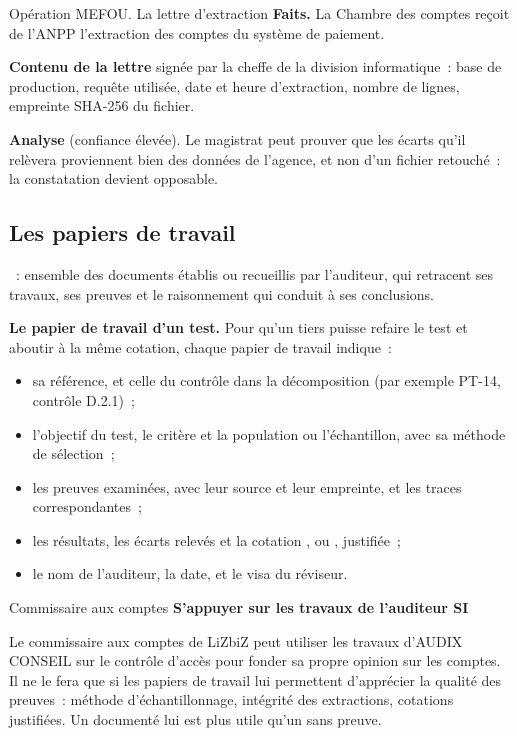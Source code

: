 \begin{boxscenario}{Opération MEFOU. La lettre d'extraction}
\textbf{Faits.} La Chambre des comptes reçoit de l'ANPP l'extraction des
comptes du système de paiement.

\medskip
\textbf{Contenu de la lettre} signée par la cheffe de la division
informatique~: base de production, requête utilisée, date et heure
d'extraction, nombre de lignes, empreinte SHA-256 du fichier.

\medskip
\textbf{Analyse} (confiance élevée). Le magistrat peut prouver que les écarts
qu'il relèvera proviennent bien des données de l'agence, et non d'un fichier
retouché~: la constatation devient opposable.
\end{boxscenario}

\subsection{Les papiers de travail}

\begin{boxdef}
~: ensemble des
documents établis ou recueillis par l'auditeur, qui retracent ses
travaux, ses preuves et le raisonnement qui conduit à ses conclusions.
\end{boxdef}

\begin{boxprocedure}
\textbf{Le papier de travail d'un test.} Pour qu'un tiers puisse refaire le
test et aboutir à la même cotation, chaque papier de travail indique~:
\begin{itemize}
    \item sa référence, et celle du contrôle dans la décomposition (par
          exemple PT-14, contrôle D.2.1)~;
    \item l'objectif du test, le critère et la population ou l'échantillon,
          avec sa méthode de sélection~;
    \item les preuves examinées, avec leur source et leur empreinte, et les
          traces correspondantes~;
    \item les résultats, les écarts relevés et la cotation \OUI{}, \NON{} ou
          \NEK{}, justifiée~;
    \item le nom de l'auditeur, la date, et le visa du réviseur.
\end{itemize}
\end{boxprocedure}

\begin{boxmetier}{Commissaire aux comptes}
\textbf{S'appuyer sur les travaux de l'auditeur SI}

Le commissaire aux comptes de LiZbiZ peut utiliser les travaux d'AUDIX
CONSEIL sur le contrôle d'accès pour fonder sa propre opinion sur les
comptes. Il ne le fera que si les papiers de travail lui permettent
d'apprécier la qualité des preuves~: méthode d'échantillonnage, intégrité des
extractions, cotations justifiées. Un \NEK{} documenté lui est plus utile
qu'un \OUI{} sans preuve.
\end{boxmetier}

